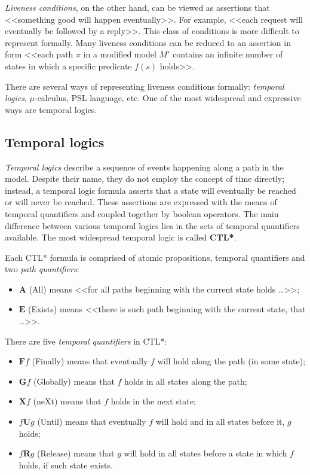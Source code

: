 \documentclass[a4paper,notitlepage,14pt]{article}
\begin{document}
\emph{Liveness conditions}, on the other hand, can be viewed as assertions that <<something good
will happen eventually>>. For example, <<each request will eventually be followed by a
reply>>. This class of conditions is more difficult to represent formally. Many liveness
conditions can be reduced to an assertion in form <<each path $\pi$ in a modified model
$M'$ contains an infinite number of states in which a specific predicate $f(s)$ holds>>.

There are several ways of representing liveness conditions formally: \emph{temporal logics},
$\mu$-calculus, PSL language, etc. One of the most widespread and expressive ways are
temporal logics.

\subsection{Temporal logics}
\label{sec:temporal-logics}

\emph{Temporal logics} describe a sequence of events happening along a path in the model. Despite
their name, they do not employ the concept of time directly; instead, a temporal logic
formula asserts that a state will eventually be reached or will never be reached. These
assertions are expressed with the means of temporal quantifiers and coupled together by
boolean operators. The main difference between various temporal logics lies in the sets of
temporal quantifiers available. The most widespread temporal logic is called \textbf{CTL*}.

Each CTL* formula is comprised of atomic propositions, temporal quantifiers and two \emph{path
quantifiers}:
\begin{itemize}
\item $\mathbf{A}$ (All) means <<for all paths beginning with the current state holds \ldots>>;
\item $\mathbf{E}$ (Exists) means <<there is such path beginning with the current state, that \ldots>>.
\end{itemize}

There are five \emph{temporal quantifiers} in CTL*:
\begin{itemize}
\item $\mathbf{F} f$ (Finally) means that eventually $f$ will hold along the path (in some state);
\item $\mathbf{G} f$ (Globally) means that $f$ holds in all states along the path;
\item $\mathbf{X} f$ (neXt) means that $f$ holds in the next state;
\item $f \mathbf{U} g$ (Until) means that eventually $f$ will hold and in all states before it, $g$
  holds;
\item $f \mathbf{R} g$ (Release) means that $g$ will hold in all states before a state in which $f$
  holds, if such state exists.
\end{itemize}
\end{document}
